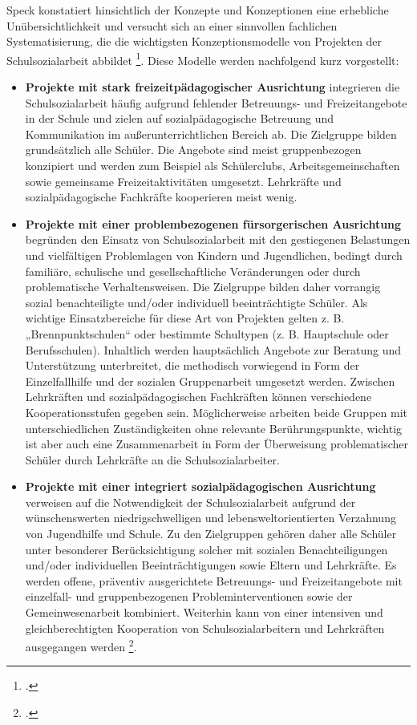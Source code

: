 Speck konstatiert hinsichtlich der Konzepte und Konzeptionen eine erhebliche Unübersichtlichkeit und versucht sich an einer sinnvollen fachlichen Systematisierung, die die wichtigsten Konzeptionsmodelle von Projekten der Schulsozialarbeit abbildet \footcite[vgl.][25f]{Speck2006}. Diese Modelle werden nachfolgend kurz vorgestellt:\\
\begin{itemize}
	\item \textbf{Projekte mit stark freizeitpädagogischer Ausrichtung} integrieren die Schulsozialarbeit häufig aufgrund fehlender Betreuungs- und Freizeitangebote in der Schule und zielen auf sozialpädagogische Betreuung und Kommunikation im außerunterrichtlichen Bereich ab. Die Zielgruppe bilden grundsätzlich alle Schüler. Die Angebote sind meist gruppenbezogen konzipiert und werden zum Beispiel als Schülerclubs, Arbeitsgemeinschaften sowie gemeinsame Freizeitaktivitäten umgesetzt. Lehrkräfte und sozialpädagogische Fachkräfte kooperieren meist wenig. 
	\item \textbf{Projekte mit einer problembezogenen fürsorgerischen Ausrichtung} begründen den Einsatz von Schulsozialarbeit mit den gestiegenen Belastungen und vielfältigen Problemlagen von Kindern und Jugendlichen, bedingt durch familiäre, schulische und gesellschaftliche Veränderungen oder durch problematische Verhaltensweisen. Die Zielgruppe bilden daher vorrangig sozial benachteiligte und/oder individuell beeinträchtigte Schüler. Als wichtige Einsatzbereiche für diese Art von Projekten gelten z. B. „Brennpunktschulen“ oder bestimmte Schultypen (z. B. Hauptschule oder Berufsschulen). Inhaltlich werden hauptsächlich Angebote zur Beratung und Unterstützung unterbreitet, die methodisch vorwiegend in Form der Einzelfallhilfe und der sozialen Gruppenarbeit umgesetzt werden. Zwischen Lehrkräften und sozialpädagogischen Fachkräften können verschiedene Kooperationsstufen gegeben sein. Möglicherweise arbeiten beide Gruppen mit unterschiedlichen Zuständigkeiten ohne relevante Berührungspunkte, wichtig ist aber auch eine Zusammenarbeit in Form der Überweisung problematischer Schüler durch Lehrkräfte an die Schulsozialarbeiter.
	\item \textbf{Projekte mit einer integriert sozialpädagogischen Ausrichtung} verweisen auf die Notwendigkeit der Schulsozialarbeit aufgrund der wünschenswerten niedrigschwelligen und lebensweltorientierten Verzahnung von Jugendhilfe und Schule. Zu den Zielgruppen gehören daher alle Schüler unter besonderer Berücksichtigung solcher mit sozialen Benachteiligungen und/oder individuellen Beeinträchtigungen sowie Eltern und Lehrkräfte. Es werden offene, präventiv ausgerichtete Betreuungs- und Freizeitangebote mit einzelfall- und gruppenbezogenen Probleminterventionen sowie der Gemeinwesenarbeit kombiniert. Weiterhin kann von einer intensiven und gleichberechtigten Kooperation von Schulsozialarbeitern und Lehrkräften ausgegangen werden \footcite[vgl.][25f]{Speck2006}. 
\end{itemize}

